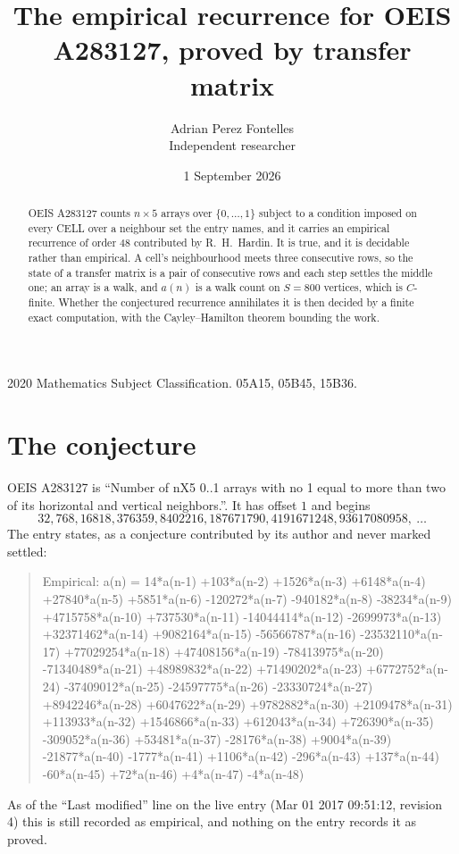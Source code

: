 \documentclass[11pt,a4paper]{article}
\title{The empirical recurrence for OEIS A283127, proved by transfer matrix}
\author{Adrian Perez Fontelles\\ \small Independent researcher}
\date{1 September 2026}
\theoremstyle{plain}
\theoremstyle{definition}
\begin{document}
\maketitle

\begin{abstract}
OEIS A283127 counts $n\times5$ arrays over $\{0,\dots,1\}$ subject to a condition imposed on
every CELL over a neighbour set the entry names, and it carries an empirical recurrence of
order $48$ contributed by R.~H.~Hardin. It is true, and it is decidable rather than
empirical. A cell's neighbourhood meets three consecutive rows, so the state of a transfer
matrix is a pair of consecutive rows and each step settles the middle one; an array is a
walk, and $a(n)$ is a walk count on $S=800$ vertices, which is $C$-finite. Whether the
conjectured recurrence annihilates it is then decided by a finite exact computation, with the
Cayley--Hamilton theorem bounding the work.
\end{abstract}

\noindent\small 2020 Mathematics Subject Classification. 05A15, 05B45, 15B36.\normalsize

\section{The conjecture}

OEIS A283127 is ``Number of nX5 0..1 arrays with no 1 equal to more than two of its horizontal and vertical neighbors.''. It has offset $1$ and begins
\[
32, 768, 16818, 376359, 8402216, 187671790, 4191671248, 93617080958,\ \dots
\]
The entry states, as a conjecture contributed by its author and never marked settled:
\begin{quote}
Empirical: a(n) = 14*a(n-1) +103*a(n-2) +1526*a(n-3) +6148*a(n-4) +27840*a(n-5) +5851*a(n-6) -120272*a(n-7) -940182*a(n-8) -38234*a(n-9) +4715758*a(n-10) +737530*a(n-11) -14044414*a(n-12) -2699973*a(n-13) +32371462*a(n-14) +9082164*a(n-15) -56566787*a(n-16) -23532110*a(n-17) +77029254*a(n-18) +47408156*a(n-19) -78413975*a(n-20) -71340489*a(n-21) +48989832*a(n-22) +71490202*a(n-23) +6772752*a(n-24) -37409012*a(n-25) -24597775*a(n-26) -23330724*a(n-27) +8942246*a(n-28) +6047622*a(n-29) +9782882*a(n-30) +2109478*a(n-31) +113933*a(n-32) +1546866*a(n-33) +612043*a(n-34) +726390*a(n-35) -309052*a(n-36) +53481*a(n-37) -28176*a(n-38) +9004*a(n-39) -21877*a(n-40) -1777*a(n-41) +1106*a(n-42) -296*a(n-43) +137*a(n-44) -60*a(n-45) +72*a(n-46) +4*a(n-47) -4*a(n-48)
\end{quote}
As of the ``Last modified'' line on the live entry (Mar 01 2017 09:51:12, revision 4) this is still
recorded as empirical, and nothing on the entry records it as proved.
\end{document}
